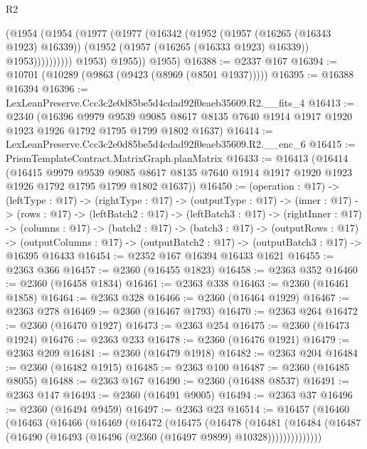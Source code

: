 \begin{lexlean}{R2}
\begin{coremodule}
                  (@1954
                    (@1954
                      (@1977
                        (@1977
                          (@16342
                            (@1952
                              (@1957 (@16265 (@16343 @1923) @16339))
                              (@1952 (@1957 (@16265 (@16333 @1923) @16339)) @1953))))))))))
            @1953)
          @1955))
      @1955)
@16388 := @2337 @167
@16394 := @10701 (@10289 (@9863 (@9423 (@8969 (@8501 @1937)))))
@16395 := @16388 @16394
@16396 := LexLeanPreserve.Ccc3c2e0d85be5d4cdad92f0eaeb35609.R2.__fits_4
@16413 := @2340
    (@16396
      @9979
      @9539
      @9085
      @8617
      @8135
      @7640
      @1914
      @1917
      @1920
      @1923
      @1926
      @1792
      @1795
      @1799
      @1802
      @1637)
@16414 := LexLeanPreserve.Ccc3c2e0d85be5d4cdad92f0eaeb35609.R2.__enc_6
@16415 := PrismTemplateContract.MatrixGraph.planMatrix
@16433 := @16413
    (@16414
      (@16415
        @9979
        @9539
        @9085
        @8617
        @8135
        @7640
        @1914
        @1917
        @1920
        @1923
        @1926
        @1792
        @1795
        @1799
        @1802
        @1637))
@16450 := (operation : @17) ->
  (leftType : @17) ->
  (rightType : @17) ->
  (outputType : @17) ->
  (inner : @17) ->
  (rows : @17) ->
  (leftBatch2 : @17) ->
  (leftBatch3 : @17) ->
  (rightInner : @17) ->
  (columns : @17) ->
  (batch2 : @17) ->
  (batch3 : @17) ->
  (outputRows : @17) ->
  (outputColumns : @17) -> (outputBatch2 : @17) -> (outputBatch3 : @17) -> @16395 @16433
@16454 := @2352 @167 @16394 @16433 @1621
@16455 := @2363 @366
@16457 := @2360 (@16455 @1823)
@16458 := @2363 @352
@16460 := @2360 (@16458 @1834)
@16461 := @2363 @338
@16463 := @2360 (@16461 @1858)
@16464 := @2363 @328
@16466 := @2360 (@16464 @1929)
@16467 := @2363 @278
@16469 := @2360 (@16467 @1793)
@16470 := @2363 @264
@16472 := @2360 (@16470 @1927)
@16473 := @2363 @254
@16475 := @2360 (@16473 @1924)
@16476 := @2363 @233
@16478 := @2360 (@16476 @1921)
@16479 := @2363 @209
@16481 := @2360 (@16479 @1918)
@16482 := @2363 @204
@16484 := @2360 (@16482 @1915)
@16485 := @2363 @100
@16487 := @2360 (@16485 @8055)
@16488 := @2363 @167
@16490 := @2360 (@16488 @8537)
@16491 := @2363 @147
@16493 := @2360 (@16491 @9005)
@16494 := @2363 @37
@16496 := @2360 (@16494 @9459)
@16497 := @2363 @23
@16514 := @16457
    (@16460
      (@16463
        (@16466
          (@16469
            (@16472
              (@16475
                (@16478
                  (@16481
                    (@16484
                      (@16487 (@16490 (@16493 (@16496 (@2360 (@16497 @9899) @10328))))))))))))))

\end{coremodule}
\end{lexlean}

